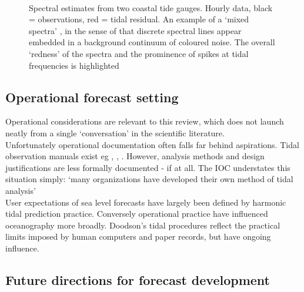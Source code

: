 \begin{figure}[!h]
	\centering
	 \\
	\caption{Spectral estimates from two coastal tide gauges. Hourly data, black = observations, red = tidal residual. An example of a `mixed spectra' \citep{Percival:1998tw}, in the sense of that discrete spectral lines appear embedded in a background continuum of coloured noise.  The overall `redness' of the spectra and the prominence of spikes at tidal frequencies is highlighted }
    \label{fig:SPECTRA_EG}
\end{figure}


\subsection{Operational forecast setting}
\label{S:operational_setting}

Operational considerations are relevant to this review, which does not launch neatly from a single `conversation' \citep{Booth:2009vy} in the scientific literature.\\
Unfortunately operational documentation often falls far behind aspirations.
Tidal observation manuals exist eg \citep{IOC:2005tj}, \citep{Level:2011wu}, \citep{Parker:2007wq}.  However, analysis methods and design justifications are less formally documented - if at all.  The IOC understates this situation simply: `many organizations have developed their own method of tidal analysis'\citep{IOC:2005tj}\\

User expectations of sea level forecasts have largely been defined by harmonic tidal prediction practice. 
Conversely operational practice have influenced oceanography more broadly. Doodson's \citep{Doodson:1928wf} tidal procedures reflect the practical limits imposed by human computers and paper records, but have ongoing influence. \\


\subsection{Future directions for forecast development}

